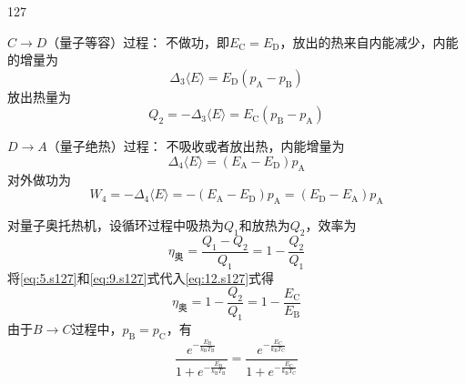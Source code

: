 \begin{solution}{127}
\begin{subsolution}
        $C \to D$（量子等容）过程：
        不做功，即$E _ { \mathrm { C } } = E _ { \mathrm { D } }$，放出的热来自内能减少，内能的增量为
        \begin{equation}
            \Delta_ {3} \langle E \rangle = E _ {\mathrm{D}} \left(p _ {\mathrm{A}} - p _ {\mathrm{B}}\right)
            \label{eq:8.s127}
        \end{equation}
        放出热量为
        \begin{equation}
            Q _ {2} = - \Delta_ {3} \langle E \rangle = E _ {\mathrm{C}} \left(p _ {\mathrm{B}} - p _ {\mathrm{A}}\right)
            \label{eq:9.s127}
        \end{equation}

        $D \to A$（量子绝热）过程：
        不吸收或者放出热，内能增量为
        \begin{equation}
            \Delta_ {4} \langle E \rangle = \left(E _ {\mathrm{A}} - E _ {\mathrm{D}}\right) p _ {\mathrm{A}}
            \label{eq:10.s127}
        \end{equation}
        对外做功为
        \begin{equation}
            W _ {4} = - \Delta_ {4} \langle E \rangle = - \left(E _ {\mathrm{A}} - E _ {\mathrm{D}}\right) p _ {\mathrm{A}} = \left(E _ {\mathrm{D}} - E _ {\mathrm{A}}\right) p _ {\mathrm{A}}
            \label{eq:11.s127}
        \end{equation}
    \end{subsolution}
    \begin{subsolution}
        对量子奥托热机，设循环过程中吸热为$Q _ { 1 }$和放热为$Q _ { 2 }$，效率为
        \begin{equation}
            \eta_ {\text {奥}} = \frac {Q _ {1} - Q _ {2}}{Q _ {1}} = 1 - \frac {Q _ {2}}{Q _ {1}}
            \label{eq:12.s127}
        \end{equation}
        将\eqref{eq:5.s127}和\eqref{eq:9.s127}式代入\eqref{eq:12.s127}式得
        \begin{equation}
            \eta_ {\text {奥}} = 1 - \frac {Q _ {2}}{Q _ {1}} = 1 - \frac {E _ {\mathrm{C}}}{E _ {\mathrm{B}}}
            \label{eq:13.s127}
        \end{equation}
        由于$B \to C$过程中，$p _ { \mathrm { B } } = p _ { \mathrm { C } }$，有
        \begin{equation}
            \frac {e ^ {- \frac {E _ {\mathrm{B}}}{k _ {\mathrm{B}} T _ {\mathrm{B}}}}}{1 + e ^ {- \frac {E _ {\mathrm{B}}}{k _ {\mathrm{B}} T _ {\mathrm{B}}}}} = \frac {e ^ {- \frac {E _ {\mathrm{C}}}{k _ {\mathrm{B}} T _ {\mathrm{C}}}}}{1 + e ^ {- \frac {E _ {\mathrm{C}}}{k _ {\mathrm{B}} T _ {\mathrm{C}}}}}

\end{equation}
\end{subsolution}
\end{solution}

